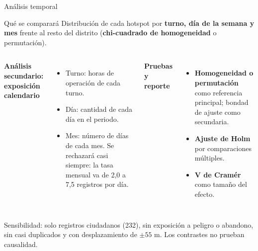 \documentclass[aspectratio=169,10pt]{beamer}
\begin{document}
\begin{frame}{Análisis temporal}
  \begin{block}{Qué se comparará}
    Distribución de cada hotspot por \textbf{turno, día de la semana y mes} frente al resto del distrito (\textbf{chi-cuadrado de homogeneidad} o permutación).
  \end{block}
  \begin{columns}[T,onlytextwidth]
      \textbf{Análisis secundario: exposición calendario}
      \begin{itemize}
        \item Turno: horas de operación de cada turno.
        \item Día: cantidad de cada día en el periodo.
        \item Mes: número de días de cada mes. Se rechazará casi siempre: la tasa mensual va de 2,0 a 7,5 registros por día.
      \end{itemize}
      \textbf{Pruebas y reporte}
      \begin{itemize}
        \item \textbf{Homogeneidad o permutación} como referencia principal; bondad de ajuste como secundaria.
        \item \textbf{Ajuste de Holm} por comparaciones múltiples.
        \item \textbf{V de Cramér} como tamaño del efecto.
      \end{itemize}
  \end{columns}
  \vspace{.15cm}
  \footnotesize Sensibilidad: solo registros ciudadanos (232), sin exposición a peligro o abandono, sin casi duplicados y con desplazamiento de $\pm55$ m. Los contrastes no prueban causalidad.
\end{frame}
\end{document}
